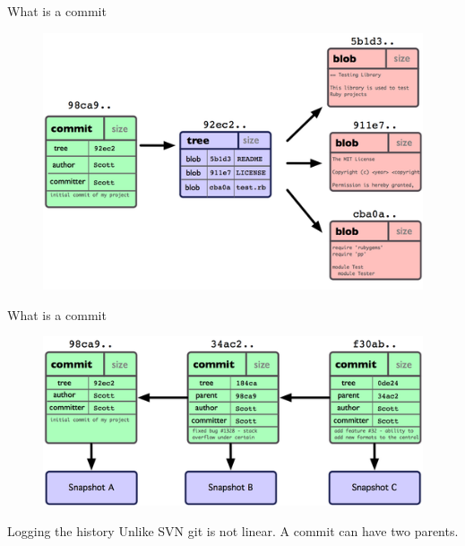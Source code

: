 \documentclass[14pt]{beamer}
\begin{document}
\begin{frame}{What is a commit}
	\begin{figure}[htb]
		\centering
		\includegraphics[width=\textwidth]{commitBlobs.png}
	\end{figure}
\end{frame}

\begin{frame}{What is a commit}
	\begin{figure}[htb]
		\centering
		\includegraphics[width=\textwidth]{commitSnapshots.png}
	\end{figure}
\end{frame}

\begin{frame}{Logging the history}
	Unlike SVN git is not linear.  A commit can have two parents.
\end{frame}
\end{document}
